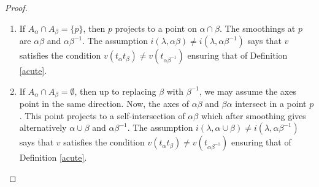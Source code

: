 \documentclass{amsart}
\newtheorem{lemma}{Lemma}
\newcommand{\ML}{\mathrm{ML}}
\begin{document}
\begin{proof}
\begin{enumerate}
    \item If $A_\alpha\cap A_\beta=\{p\}$, then $p$ projects to a point on $\alpha\cap \beta$. The smoothings at $p$ are $\alpha\beta$ and $\alpha\beta^{-1}$. The assumption $i(\lambda, \alpha\beta)\ne i(\lambda, \alpha\beta^{-1})$ says that $v$ satisfies the condition $v(t_\alpha t_\beta)\ne v(t_{\alpha\beta^{-1}})$ ensuring that of Definition \ref{acute}.
    
    \item If $A_\alpha\cap A_\beta=\emptyset$, then up to replacing $\beta$ with $\beta^{-1}$, we may assume the axes point in the same direction. Now, the axes of $\alpha\beta$ and $\beta\alpha$ intersect in a point $p$. This point projects to a self-intersection of $\alpha\beta$ which after smoothing gives alternatively $\alpha\cup \beta$ and $\alpha \beta^{-1}$. The assumption $i(\lambda, \alpha \cup \beta)\ne i(\lambda, \alpha\beta^{-1})$ says that $v$ satisfies the condition $v(t_\alpha t_\beta)\ne v(t_{\alpha\beta^{-1}})$ ensuring that of Definition \ref{acute}.
\end{enumerate}
%
%
%
\end{proof}

\end{document}
